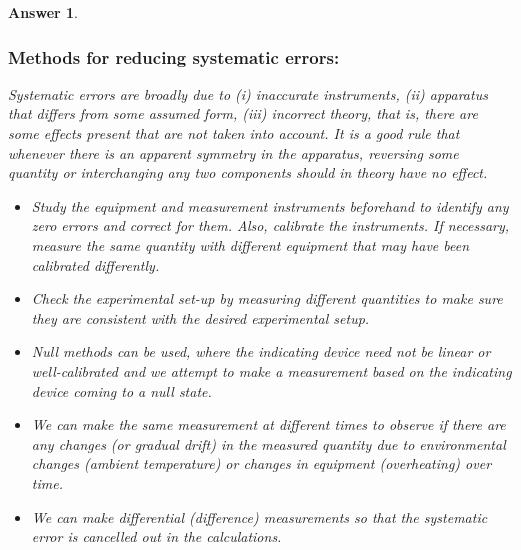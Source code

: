 \documentclass[a4paper]{article}
\newtheorem{ans}{Answer}[subsection]
\theoremstyle{new}
\begin{document}
\begin{ans}\leavevmode
\subsubsection*{Methods for reducing systematic errors:}
Systematic errors are broadly due to (i) inaccurate instruments, (ii) apparatus that differs from some assumed form, (iii) incorrect theory, that is, there are some effects present that are not taken into account. It is a good rule that whenever there is an apparent symmetry in the apparatus, reversing some quantity or interchanging any two components should in theory have no effect.
\begin{itemize}
    \item Study the equipment and measurement instruments beforehand to identify any zero errors and correct for them. Also, calibrate the instruments. If necessary, measure the same quantity with different equipment that may have been calibrated differently.
    \item Check the experimental set-up by measuring different quantities to make sure they are consistent with the desired experimental setup.
    \item Null methods can be used, where the indicating device need not be linear or well-calibrated and we attempt to make a measurement based on the indicating device coming to a null state.
    \item We can make the same measurement at different times to observe if there are any changes (or gradual drift) in the measured quantity due to environmental changes (ambient temperature) or changes in equipment (overheating) over time.
    \item We can make differential (difference) measurements so that the systematic error is cancelled out in the calculations.
\end{itemize}

\end{ans}
\end{document}
